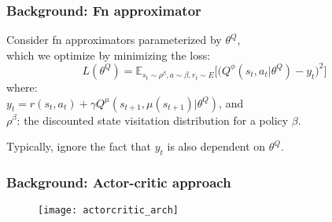 \begin{frame}
\frametitle{Background: Fn approximator}
Consider fn approximators parameterized by $\theta^Q$, \\
which we optimize by minimizing the loss:
\begin{equation} \label{equ:qloss}
L(\theta^Q) =\mathbb{E}_{s_t \sim \rho^{\beta}, a \sim \beta, r_t \sim E} \Big[ \Big( Q^{\phi} (s_t,a_t|\theta^Q) - y_t \Big)^2 \Big]
\end{equation}
where:\\
$y_t = r(s_t,a_t) + \gamma Q^{\mu}(s_{t+1},\mu(s_{t+1}) | \theta^Q)$, and \\
$\rho^{\beta}$: the discounted state visitation distribution for a policy $\beta$.
\vspace{5mm}

Typically, ignore the fact that $y_t$ is also dependent on $\theta^Q$.\\
\end{frame}

\begin{frame}
\frametitle{Background: Actor-critic approach}
\begin{figure}
    \centering
    \texttt{[image: actorcritic\_arch]}
\end{figure}
\end{frame}


